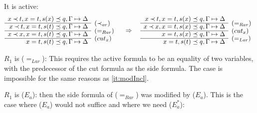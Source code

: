 \begin{PROOF}
\begin{LS}
\begin{LSA}
\begin{LSB}
 \item It is active:
\[ \begin{array}{rl}
 x\Incl t, x=t, s(x)\preceq q, \GSD \\ \cline{1-1}
 x\Incl t, x=t, s(t)\preceq q, \GSD & \rabove{(\Incl_{ar})} \\ \cline{1-1}
 x\Incl x, x=t, s(t)\preceq q, \GSD & \rabove{(=_{Rar})} \\ \cline{1-1}
           x=t, s(t)\preceq q, \GSD & \rabove{(cut_x)} \end{array} \conv
 \begin{array}{rl}
 x\Incl t, x=t, s(x)\preceq q, \GSD \\ \cline{1-1}
 x\Incl x, x=t, s(x)\preceq q, \GSD & \rabove{(=_{Rar})} \\ \cline{1-1}
          x=t, s(x)\preceq q, \GSD & \rabove{(cut_x)} \\ \cline{1-1}
           x=t, s(t)\preceq q, \GSD & \rabove{(=_{Lar})} \end{array} \]
\end{LSB}
\item $R_1$ is ($=_{Lar}$):
This requires the active formula to be an equality of two variables, with the
predecessor of the cut formula as the side formula. The
case is impossible for the same reasons as \ref{it:modIncl}.
%
\item $R_1$ is ($E_a$):
then the side formula of ($=_{Rar}$) was modified by ($E_a$). This is the case
where ($E_a$) would not suffice and where we need ($E_a^*$):

\end{LSA}
\end{LS}
\end{PROOF}
